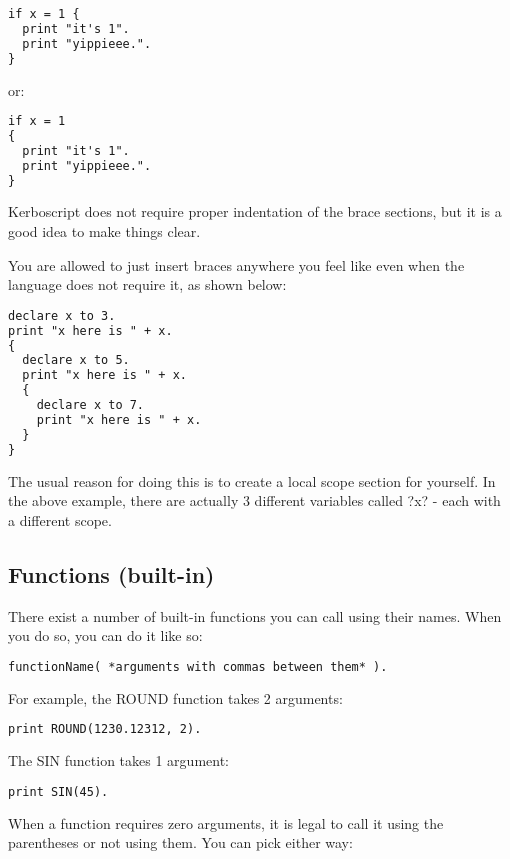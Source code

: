 \begin{lstlisting}[frame=single,language=XML]
if x = 1 {
  print "it's 1".
  print "yippieee.".
}
\end{lstlisting}

or:

\begin{lstlisting}[frame=single,language=XML]
if x = 1
{
  print "it's 1".
  print "yippieee.".
}
\end{lstlisting}

Kerboscript does not require proper indentation of the brace sections, but it is a good idea to make things clear.

You are allowed to just insert braces anywhere you feel like even when the language does not require it, as shown below:

\begin{lstlisting}[frame=single,language=XML]
declare x to 3.
print "x here is " + x.
{
  declare x to 5.
  print "x here is " + x.
  {
    declare x to 7.
    print "x here is " + x.
  }
}
\end{lstlisting}

The usual reason for doing this is to create a local scope section for yourself. In the above example, there are actually 3 different variables called ?x? - each with a different scope.

\subsection{Functions (built-in)}
There exist a number of built-in functions you can call using their names. When you do so, you can do it like so:

\begin{lstlisting}[frame=single,language=XML]
functionName( *arguments with commas between them* ).
\end{lstlisting}

For example, the ROUND function takes 2 arguments:

\begin{lstlisting}[frame=single,language=XML]
print ROUND(1230.12312, 2).
\end{lstlisting}

The SIN function takes 1 argument:

\begin{lstlisting}[frame=single,language=XML]
print SIN(45).
\end{lstlisting}

When a function requires zero arguments, it is legal to call it using the parentheses or not using them. You can pick either way:

